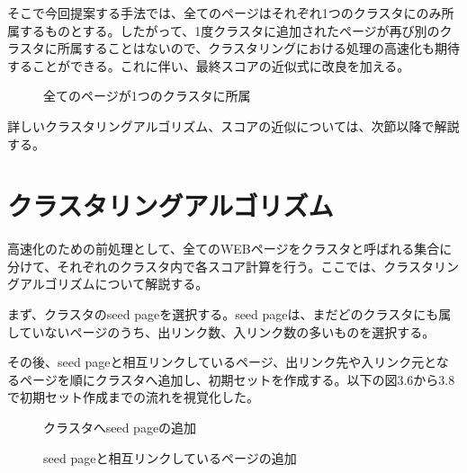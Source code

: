 \documentclass[a4paper,11pt]{jreport}
\begin{document}
そこで今回提案する手法では、全てのページはそれぞれ1つのクラスタにのみ所属するものとする。したがって、1度クラスタに追加されたページが再び別のクラスタに所属することはないので、クラスタリングにおける処理の高速化も期待することができる。これに伴い、最終スコアの近似式に改良を加える。

\begin{figure}[htbp]
\begin{center}
\end{center}
\caption{全てのページが1つのクラスタに所属}
\label{figure:sample}
\end{figure}

詳しいクラスタリングアルゴリズム、スコアの近似については、次節以降で解説する。

\section{クラスタリングアルゴリズム}

高速化のための前処理として、全てのWEBページをクラスタと呼ばれる集合に分けて、それぞれのクラスタ内で各スコア計算を行う。ここでは、クラスタリングアルゴリズムについて解説する。

まず、クラスタのseed pageを選択する。seed pageは、まだどのクラスタにも属していないページのうち、出リンク数、入リンク数の多いものを選択する。

その後、seed pageと相互リンクしているページ、出リンク先や入リンク元となるページを順にクラスタへ追加し、初期セットを作成する。以下の図3.6から3.8で初期セット作成までの流れを視覚化した。

\begin{figure}[htbp]
\begin{center}
\end{center}
\caption{クラスタへseed pageの追加}
\label{figure:sample}
\end{figure}

\begin{figure}[htbp]
\begin{center}
\end{center}
\caption{seed pageと相互リンクしているページの追加}
\label{figure:sample}
\end{figure}
\end{document}
